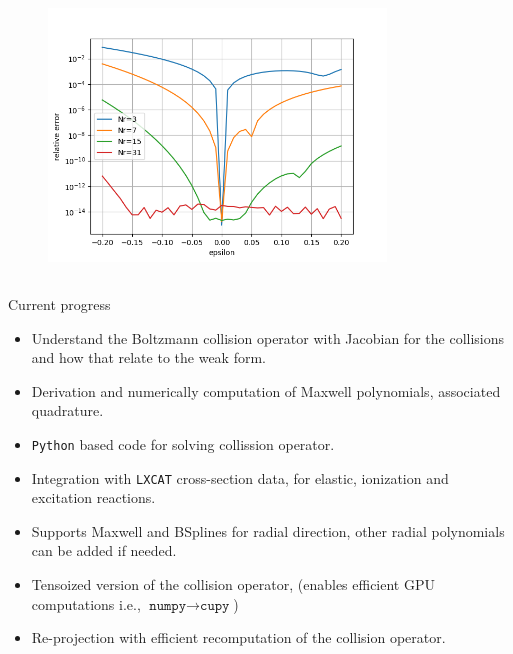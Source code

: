 \documentclass[mathserif, aspectratio=169]{beamer}
\begin{document}
\begin{frame}
\begin{columns}
\begin{column}{0.6\textwidth}
\begin{figure}
{					}
					\only<+>
					{
						\includegraphics[width=0.8\textwidth]{../fig/basis_1ev_grid.png}
					}
					
				\end{figure}	
			\end{column}
		\end{columns}
	\end{frame}
	
	\begin{frame}{Current progress}
		\begin{itemize}
			\item Understand the Boltzmann collision operator with Jacobian for the collisions and how that relate to the weak form. 
			\item Derivation and numerically computation of Maxwell polynomials, associated quadrature. 
			\item \texttt{Python} based code for solving collission operator. 
			\item Integration with \texttt{LXCAT} cross-section data, for elastic, ionization and excitation reactions. 
			\item Supports Maxwell and BSplines for radial direction, other radial polynomials can be added if needed. 
			\item Tensoized version of the collision operator, (enables efficient GPU computations i.e., $\texttt{numpy} \rightarrow \texttt{cupy}$)
			\item Re-projection with efficient recomputation of the collision operator. 
		\end{itemize}
	\end{frame}
\end{document}
